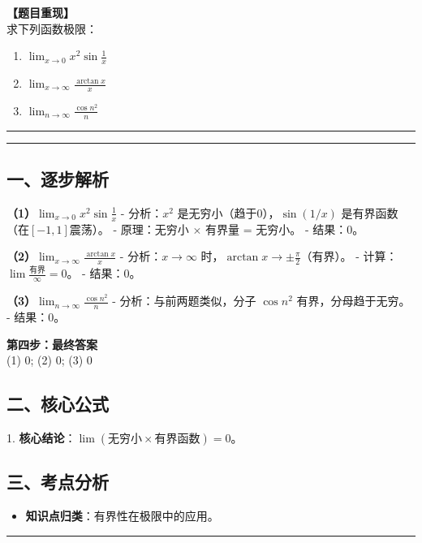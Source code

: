 \documentclass[12pt, a4paper]{ctexart}
\newcommand{\TopSeparator}{
    \par\noindent\rule{\textwidth}{1.5pt}\vspace{0.5em} %
}
\newcommand{\AnalysisSeparator}{
    \par\noindent\rule{\textwidth}{0.5pt}\vspace{0.2em}\hrule\vspace{0.5em} %
}
\newenvironment{RedAnalysis}{
    \par
    \color{red} %
}{
    \par
    \color{black} %
}
\begin{document}
\textbf{【题目重现】} \\
求下列函数极限：
\begin{enumerate}
    \item $ \lim_{x\to0}x^{2}\sin\frac{1}{x} $
    \item $ \lim_{x\to\infty}\frac{\arctan x}{x} $
    \item $ \lim_{n\to\infty}\frac{\cos n^{2}}{n} $
\end{enumerate}

\AnalysisSeparator

\begin{RedAnalysis}

\subsection*{一、逐步解析}

\textbf{（1）$ \lim_{x\to0}x^{2}\sin\frac{1}{x} $}
   - 分析：$x^2$ 是无穷小（趋于0），$\sin(1/x)$ 是有界函数（在$[-1, 1]$震荡）。
   - 原理：无穷小 $\times$ 有界量 = 无穷小。
   - 结果：0。

\textbf{（2）$ \lim_{x\to\infty}\frac{\arctan x}{x} $}
   - 分析：$x \to \infty$ 时，$\arctan x \to \pm \frac{\pi}{2}$（有界）。
   - 计算：$\lim \frac{\text{有界}}{\infty} = 0$。
   - 结果：0。

\textbf{（3）$ \lim_{n\to\infty}\frac{\cos n^{2}}{n} $}
   - 分析：与前两题类似，分子 $\cos n^2$ 有界，分母趋于无穷。
   - 结果：0。

\textbf{第四步：最终答案} \\
(1) 0; (2) 0; (3) 0

\subsection*{二、核心公式}
1. \textbf{核心结论}：$\lim (\text{无穷小} \times \text{有界函数}) = 0$。

\subsection*{三、考点分析}
\begin{itemize}
    \item \textbf{知识点归类}：有界性在极限中的应用。
\end{itemize}

\end{RedAnalysis}

\vspace{2em}

\TopSeparator
\end{document}
